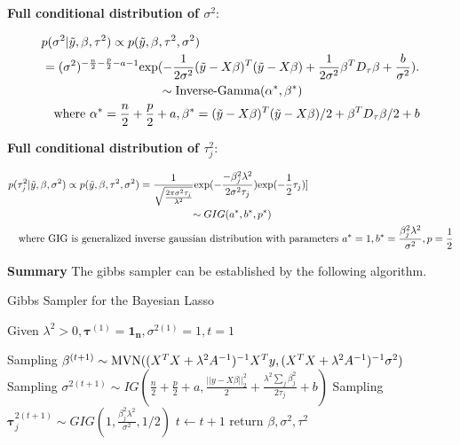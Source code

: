 \textbf{Full conditional distribution of $\sigma^2$}:

\begin{equation}
	\begin{multlined}
		p(\sigma^2|\tilde{y},\beta,\tau^2) \propto  	p(\tilde{y},\beta,\tau^2,\sigma^2)  \\
		= (\sigma^2)^{-\frac{n}{2}-\frac{p}{2}-a-1}\textnormal{exp}(-\frac{1}{2\sigma^2}(\tilde{y}-X\beta)^T(\tilde{y}-X\beta)+\frac{1}{2\sigma^2}\beta^TD_{\tau}\beta+\frac{b}{\sigma^2}).\\
		\sim \textnormal{Inverse-Gamma}(\alpha^*,\beta^*)\\
		\textnormal{where } \alpha^* = \frac{n}{2}+\frac{p}{2}+a, \beta^* = 
		(\tilde{y}-X\beta)^T(\tilde{y}-X\beta)/2 + \beta^TD_{\tau}\beta/2 +b
	\end{multlined}
\end{equation}

\textbf{Full conditional distribution of $\tau_j^2$}:

\begin{equation}
	\begin{multlined}
		p(\tau_j^2|\tilde{y},\beta,\sigma^2) \propto  	p(\tilde{y},\beta,\tau^2,\sigma^2)  
		= \frac{1}{\sqrt{\frac{2\pi\sigma^2\tau_j}{\lambda^2}}}\textnormal{exp}(-\frac{-\beta_j^2\lambda^2}{2\sigma^2\tau_j})\textnormal{exp}(-\frac{1}{2}\tau_j)]\\
		\sim GIG(a^*,b^*,p^*)\\
		\textnormal{where GIG is generalized inverse gaussian distribution with parameters } a^* = 1, b^* = \frac{\beta_j^2\lambda^2}{\sigma^2}, p = \frac{1}{2}
	\end{multlined}
\end{equation}

\textbf{Summary}
The gibbs sampler can be established by the following algorithm.
\begin{algorithm}
	\caption{Gibbs Sampler for the Bayesian Lasso}
	\begin{algorithmic}[1]
		
		\State Given $\lambda^2>0, \mathbf{\tau}^{(1)} = \mathbf{1_n}, \sigma^{2(1)} =1 , t=1$ 
		
		\State Sampling $\mathbf{\beta}^{(t+1)} \sim \textnormal{MVN}((X^TX+\lambda^2A^{-1})^{-1}X^Ty,(X^TX+\lambda^2A^{-1})^{-1}\sigma^2) $  
		\State Sampling $\sigma^{2(t+1)} \sim IG(\frac{n}{2}+\frac{p}{2}+a,\frac{||y-X\beta||_2^2}{2}+\frac{\lambda^2\sum_j{\beta_j^2}}{2\tau_j}+b)$ 
		\State Sampling $\mathbf{\tau}_j^{2(t+1)} \sim GIG(1,\frac{\beta_j^2\lambda^2}{\sigma^2},1/2)$ 
		\EndFor
		\State $t \leftarrow t + 1$
		\EndWhile  \label{roy's loop}
		\State return $\beta,\sigma^2,\tau^2$
		
		
	\end{algorithmic}
\end{algorithm}


